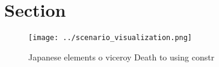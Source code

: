 \documentclass[a4paper]{article}
\begin{document}
\section{Section}

\begin{figure}
\centering
\texttt{[image: ../scenario\_visualization.png]}
\caption{Japanese elements o viceroy Death to using constr
}
\end{figure}
 
\end{document}
